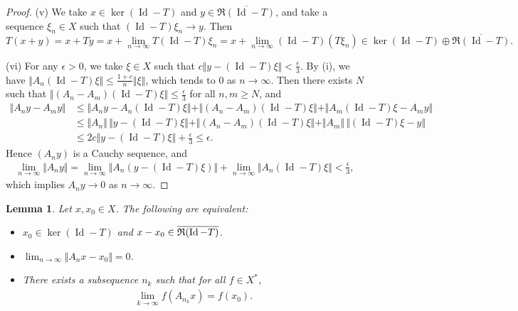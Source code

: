 \documentclass{article}
\numberwithin{equation}{section}
\newcommand{\ol}{\overline}
\DeclareMathOperator{\id}{Id}
\theoremstyle{plain}
\newtheorem{lemma}[theorem]{Lemma}
\theoremstyle{definition}
\begin{document}
\begin{proof}
\item (v) We take $x\in\ker(\id-T)$ and $y\in\ol{\mathfrak{R}(\id-T)}$, and take a sequence $\xi_n\in X$ such that $(\id-T)\xi_n\to y$. Then $$T(x+y)=x+Ty=x+\lim_{n\to\infty}T(\id-T)\xi_n=x+\lim_{n\to\infty}(\id-T)(T\xi_n)\in\ker(\id-T)\oplus\ol{\mathfrak{R}(\id-T)}.$$
\item (vi) For any $\epsilon>0$, we take $\xi\in X$ such that $c\Vert y-(\id-T)\xi\Vert<\frac{\epsilon}{3}$. By (i), we have $\Vert A_n(\id-T)\xi\Vert\leq\frac{1+c}{n}\Vert\xi\Vert$, which tends to $0$ as $n\to\infty$. Then there exists $N$ such that $\Vert (A_n-A_m)(\id-T)\xi\Vert\leq\frac{\epsilon}{3}$ for all $n,m\geq N$, and
\begin{align*}
	\Vert A_n y-A_m y\Vert&\leq\Vert A_n y-A_n(\id-T)\xi\Vert+\Vert (A_n-A_m)(\id-T)\xi\Vert+\Vert A_m(\id-T)\xi-A_m y\Vert\\
	&\leq\Vert A_n\Vert\,\Vert y-(\id-T)\xi\Vert+\Vert (A_n-A_m)(\id-T)\xi\Vert+\Vert A_m\Vert\,\Vert(\id-T)\xi-y\Vert\\
	&\leq 2c\Vert y-(\id-T)\xi\Vert+\frac{\epsilon}{3}\leq\epsilon.
\end{align*}
Hence $(A_ny)$ is a Cauchy sequence, and
\begin{align*}
	\lim_{n\to\infty}\Vert A_ny\Vert = \lim_{n\to\infty}\Vert A_n(y-(\id-T)\xi)\Vert+\lim_{n\to\infty}\Vert A_n(\id-T)\xi\Vert<\frac{\epsilon}{3},
\end{align*}
which implies $A_ny\to 0$ as $n\to\infty$.
\end{proof}
\begin{lemma}\label{meanerglemma2}
Let $x,x_0\in X$. The following are equivalent:
\begin{itemize}
\item[(a)] $x_0\in\ker(\id-T)$ and $x-x_0\in\ol{\frak{R}(\id-T)}$.
\item[(b)] $\lim_{n\to\infty}\Vert A_nx-x_0\Vert =0$.
\item[(c)] There exists a subsequence $n_k$ such that for all $f\in X^*$,
\begin{align*}
	\lim_{k\to\infty} f(A_{n_k}x)=f(x_0).
\end{align*}
\end{itemize}
\end{lemma}
\end{document}
